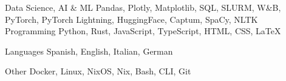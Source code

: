 

\begin{cvskills}


  \cvskill
    {Data Science, AI \& ML} %
    {Pandas, Plotly, Matplotlib, SQL, SLURM, W\&B, PyTorch, PyTorch Lightning, HuggingFace, Captum, SpaCy, NLTK} %
  \cvskill
    {Programming} %
    {Python, Rust, JavaScript, TypeScript, HTML, CSS, LaTeX} %

  \cvskill
    {Languages} %
    {Spanish, English, Italian, German} %

  \cvskill
    {Other}
    {Docker, Linux, NixOS, Nix, Bash, CLI, Git}

\end{cvskills}
